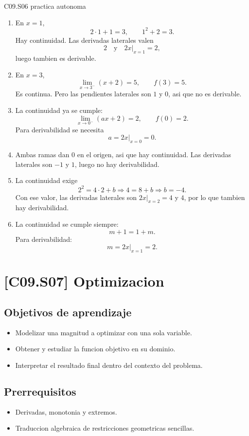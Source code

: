 \begin{fullsolution}{C09.S06 practica autonoma}
\begin{enumerate}[label=\textbf{PX-C09.S06-\arabic*:}, leftmargin=*]
  \item En \(x=1\),
  \[
  2\cdot 1+1=3,\qquad 1^2+2=3.
  \]
  Hay continuidad. Las derivadas laterales valen
  \[
  2 \quad \text{y} \quad 2x|_{x=1}=2,
  \]
  luego tambien es derivable.
  \item En \(x=3\),
  \[
  \lim_{x\to 3^-}(x+2)=5,\qquad f(3)=5.
  \]
  Es continua. Pero las pendientes laterales son \(1\) y \(0\), asi que no es derivable.
  \item La continuidad ya se cumple:
  \[
  \lim_{x\to 0^-}(ax+2)=2,\qquad f(0)=2.
  \]
  Para derivabilidad se necesita
  \[
  a=2x|_{x=0}=0.
  \]
  \item Ambas ramas dan \(0\) en el origen, asi que hay continuidad. Las derivadas laterales
  son \(-1\) y \(1\), luego no hay derivabilidad.
  \item La continuidad exige
  \[
  2^2=4\cdot 2+b \Longrightarrow 4=8+b \Longrightarrow b=-4.
  \]
  Con ese valor, las derivadas laterales son \(2x|_{x=2}=4\) y \(4\), por lo que tambien hay
  derivabilidad.
  \item La continuidad se cumple siempre:
  \[
  m+1=1+m.
  \]
  Para derivabilidad:
  \[
  m=2x|_{x=1}=2.
  \]
\end{enumerate}
\end{fullsolution}

\section{[C09.S07] Optimizacion}

\subsection*{Objetivos de aprendizaje}
\begin{itemize}
  \item Modelizar una magnitud a optimizar con una sola variable.
  \item Obtener y estudiar la funcion objetivo en su dominio.
  \item Interpretar el resultado final dentro del contexto del problema.
\end{itemize}

\subsection*{Prerrequisitos}
\begin{itemize}
  \item Derivadas, monotonia y extremos.
  \item Traduccion algebraica de restricciones geometricas sencillas.
\end{itemize}

